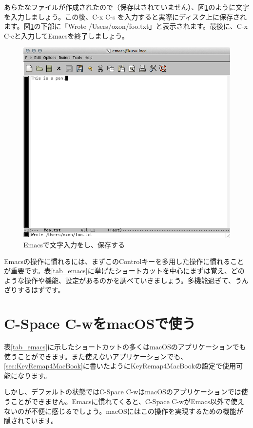 あらたなファイルが作成されたので（保存はされていません）、図\ref{fig:emacs3_png}のように文字を入力しましょう。この後、C-x C-s を入力すると実際にディスク上に保存されます。図\ref{fig:emacs3_png}の下部に「Wrote /Users/oxon/foo.txt」と表示されます。最後に、C-x C-cと入力してEmacsを終了しましょう。

\begin{figure}
  \centering
  \includegraphics[scale=0.35]{fig/emacs3.png}
  \caption{Emacsで文字入力をし、保存する}
  \label{fig:emacs3_png}
\end{figure}

Emacsの操作に慣れるには、まずこのControlキーを多用した操作に慣れることが重要です。表\ref{tab_emacs}に挙げたショートカットを中心にまずは覚え、どのような操作や機能、設定があるのかを調べていきましょう。多機能過ぎて、うんざりするはずです。

\section{C-Space C-wをmacOSで使う}

表\ref{tab_emacs}に示したショートカットの多くはmacOSのアプリケーションでも使うことができます。また使えないアプリケーションでも、\ref{sec:KeyRemap4MacBook}に書いたようにKeyRemap4MacBookの設定で使用可能になります。

しかし、デフォルトの状態ではC-Space C-wはmacOSのアプリケーションでは使うことができません。Emacsに慣れてくると、C-Space C-wがEmacs以外で使えないのが不便に感じるでしょう。macOSにはこの操作を実現するための機能が隠されています。

